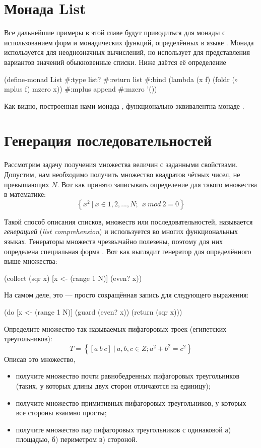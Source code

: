 \section[2]{Монада List}%
Все дальнейшие примеры в этой главе будут приводиться для монады  с использованием форм и монадических функций, определённых в языке \Scheme. Монада  используется для неоднозначных вычислений, но использует для представления вариантов значений обыкновенные списки. Ниже даётся её определение  

\begin{SchemeCode}
(define-monad List
  #:type list?
  #:return list
  #:bind (lambda (x f) (foldr ($\circ$ mplus f) mzero x))
  #:mplus append
  #:mzero '())
\end{SchemeCode}

Как видно, построенная нами монада , функционально эквивалентна монаде .

\section{Генерация последовательностей}%
Рассмотрим задачу получения множества величин с заданными свойствами. Допустим, нам необходимо получить множество квадратов чётных чисел, не превышающих $N$.  Вот как принято записывать определение для такого множества в математике:  $$\left\{ x^2~|~x \in {1, 2, ..., N};~~ x~mod~2 = 0 \right\}$$

Такой способ описания списков, множеств или последовательностей, называется \emph{генерацией} (\emph{list comprehension}) и используется во многих функциональных языках. Генераторы множеств чрезвычайно полезены, поэтому для них определена специальная форма .
Вот как выглядит генератор для определённого выше множества:
\begin{SchemeCode}[emph={x,N}]
  (collect (sqr x) [x <- (range 1 N)] (even? x))
\end{SchemeCode}
\noindent
На самом деле, это --- просто сокращённая запись для следующего выражения:
\begin{SchemeCode}[emph={x,N}]
  (do [x <- (range 1 N)]
      (guard (even? x))
      (return (sqr x)))
\end{SchemeCode}

\begin{Assignment}
Определите множество так называемых пифагоровых троек (египетских треугольников):
$$T = \left\{ [a~b~c]~|~a,b,c \in Z; a^2 + b^2 = c^2 \right\}$$
Описав это множество,
\begin{itemize}
  \item получите множество почти равнобедренных пифагоровых треугольников (таких, у которых длины двух сторон отличаются на единицу);
  \item получите множество примитивных пифагоровых треугольников, у которых все стороны взаимно просты;
  \item получите множество пар пифагоровых треугольников с одинаковой а) площадью, б) периметром в) стороной.
\end{itemize}
\end{Assignment}


